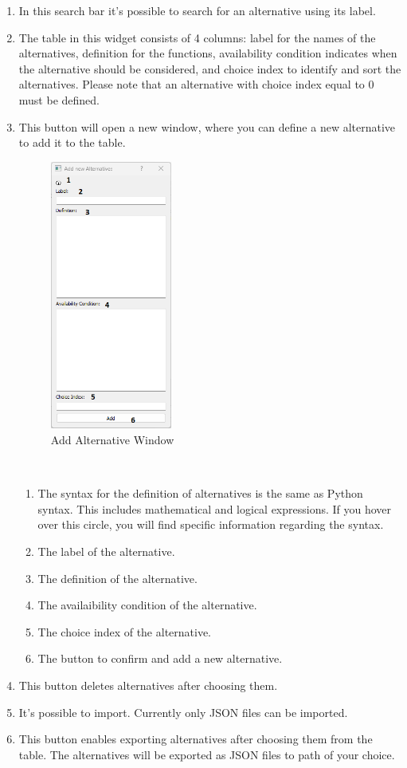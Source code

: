 \documentclass{article}
\begin{document}
\begin{enumerate} [label=\textbf{\arabic*})]
    \item In this search bar it's possible to search for an alternative using its label.
    \item The table in this widget consists of 4 columns: label for the names of the alternatives,  definition for the functions, availability condition indicates when the alternative should be considered, and choice index to identify and sort the alternatives. Please note that an alternative with choice index equal to 0 must be defined.
    \item This button will open a new window, where you can define a new alternative to add it to the table. \\
    \newpage
    \begin{figure}
        \centering
        \includegraphics[width = 4cm]{docs/User Manual/img/newAltNew.png}
        \caption{Add Alternative Window}
        \label{fig:adAlt}
    \end{figure} \\
    \begin{enumerate}[label=\textbf{\arabic*})]
        \item The syntax for the definition of alternatives is the same as Python syntax. This includes mathematical and logical expressions. If you hover over this circle, you will find specific information regarding the syntax.
        \item The label of the alternative.
        \item The definition of the alternative.
        \item The availaibility condition of the alternative.
        \item The choice index of the alternative.
        \item The button to confirm and add a new alternative.
    \end{enumerate}
    \item This button deletes alternatives after choosing them.
    \item It's possible to import. Currently only JSON files can be imported.
    \item This button enables exporting alternatives after choosing them from the table. The alternatives will be exported as JSON files to path of your choice.
\end{enumerate}
\newpage
\end{document}
